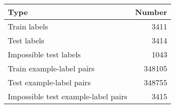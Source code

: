 \begin{tabular}{lr}
\toprule
                                Type &  Number \\
\midrule
                        Train labels &    3411 \\
                         Test labels &    3414 \\
              Impossible test labels &    1043 \\
           Train example-label pairs &  348105 \\
            Test example-label pairs &  348755 \\
 Impossible test example-label pairs &    3415 \\
\bottomrule
\end{tabular}
